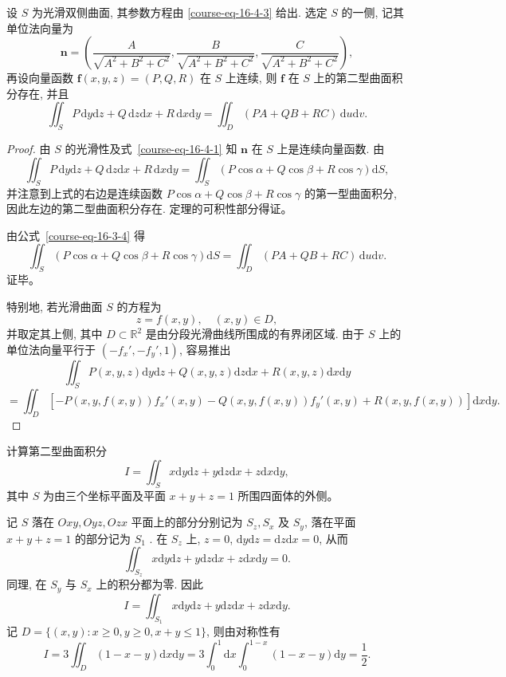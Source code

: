 \documentclass[12pt,fontset=fandol]{ctexart}
\begin{document}
\begin{theorem}\label{course-theorem-16-4-1}\quad 设 $S$ 为光滑双侧曲面, 其参数方程由 \eqref{course-eq-16-4-3}  给出. 选定 $S$ 的一侧, 记其单位法向量为
\[
  \boldsymbol n=\left(
    \frac{A}{\sqrt{A^2+B^2+C^2}},
    \frac{B}{\sqrt{A^2+B^2+C^2}},
    \frac{C}{\sqrt{A^2+B^2+C^2}}
  \right),
\]
再设向量函数 $\boldsymbol f(x,y,z)=(P,Q,R)$ 在 $S$ 上连续, 则 $\boldsymbol f$ 在 $S$ 上的第二型曲面积分存在, 并且
\[
  \iint_S P\,\mathrm dy\mathrm dz+Q\,\mathrm dz\mathrm dx+R\,\mathrm dx\mathrm dy
  =\iint_D(PA+QB+RC)\,\mathrm du\mathrm dv.
\]

\end{theorem}
\begin{proof}\quad 由 $S$ 的光滑性及式~\eqref{course-eq-16-4-1}  知 $\boldsymbol n$ 在 $S$ 上是连续向量函数. 由
\begin{equation}
  \iint_S P\,\mathrm dy\mathrm dz+Q\,\mathrm dz\mathrm dx+R\,\mathrm dx\mathrm dy
  =\iint_S(P\cos\alpha+Q\cos\beta+R\cos\gamma)\mathrm dS,
  \label{course-eq-16-4-4}
\end{equation}
并注意到上式的右边是连续函数 $P\cos\alpha+Q\cos\beta+R\cos\gamma$ 的第一型曲面积分, 因此左边的第二型曲面积分存在. 定理的可积性部分得证。

由公式~\eqref{course-eq-16-3-4}  得
\[
  \iint_S(P\cos\alpha+Q\cos\beta+R\cos\gamma)\mathrm dS
  =\iint_D(PA+QB+RC)\,\mathrm du\mathrm dv.
\]
证毕。

特别地, 若光滑曲面 $S$ 的方程为
\[
  z=f(x,y),\quad (x,y)\in D,
\]
并取定其上侧, 其中 $D\subset\mathbb R^2$ 是由分段光滑曲线所围成的有界闭区域. 由于 $S$ 上的单位法向量平行于 $(-f_x',-f_y',1)$, 容易推出
\[
  \iint_S P(x,y,z)\mathrm dy\mathrm dz+Q(x,y,z)\mathrm dz\mathrm dx+R(x,y,z)\mathrm dx\mathrm dy
\]
\[
  =\iint_D[-P(x,y,f(x,y))f_x'(x,y)-Q(x,y,f(x,y))f_y'(x,y)
  +R(x,y,f(x,y))]\mathrm dx\mathrm dy.
\]

\end{proof}
\begin{example}\label{course-example-16-4-2}\quad 计算第二型曲面积分
\[
  I=\iint_S x\mathrm dy\mathrm dz+y\mathrm dz\mathrm dx+z\mathrm dx\mathrm dy,
\]
其中 $S$ 为由三个坐标平面及平面 $x+y+z=1$ 所围四面体的外侧。

\end{example}
\noindent{}\quad 记 $S$ 落在 $Oxy,Oyz,Ozx$ 平面上的部分分别记为 $S_z,S_x$ 及 $S_y$, 落在平面 $x+y+z=1$ 的部分记为 $S_1$ . 在 $S_z$ 上, $z=0$, $\mathrm dy\mathrm dz=\mathrm dz\mathrm dx=0$, 从而
\[
  \iint_{S_z}x\mathrm dy\mathrm dz+y\mathrm dz\mathrm dx+z\mathrm dx\mathrm dy=0.
\]
同理, 在 $S_y$ 与 $S_x$ 上的积分都为零. 因此
\[
  I=\iint_{S_1}x\mathrm dy\mathrm dz+y\mathrm dz\mathrm dx+z\mathrm dx\mathrm dy.
\]
记 $D=\{(x,y):x\geqslant0,y\geqslant0,x+y\leqslant1\}$, 则由对称性有
\[
  I=3\iint_D(1-x-y)\mathrm dx\mathrm dy
  =3\int_0^1\mathrm dx\int_0^{1-x}(1-x-y)\mathrm dy=\frac12.
\]
\end{document}
